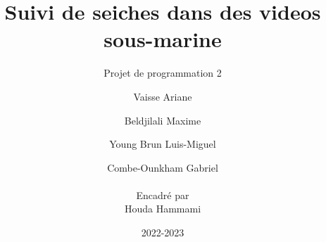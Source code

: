 \documentclass[12pt, a4paper]{scrbook}
\title{ Suivi de seiches dans des videos sous-marine}
\subtitle{Projet de programmation 2 }         %
\author{ Vaisse Ariane \and Beldjilali Maxime \and Young Brun Luis-Miguel \and Combe-Ounkham Gabriel \\ \\
		\small{Encadré par} \\ \small{Houda Hammami}}
\date{2022-2023}
\begin{document}
\maketitle



\tableofcontents \clearpage

\listoffigures \clearpage

\listofalgorithms \clearpage

















\printbibliography


\end{document}
